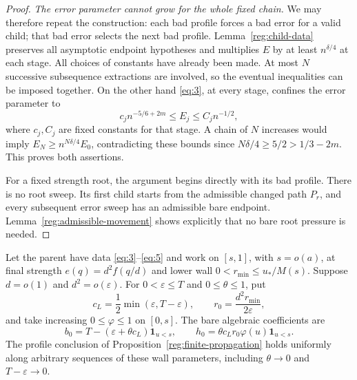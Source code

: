\begin{proof}
\emph{The error parameter cannot grow for the whole fixed chain.}
We may therefore repeat the construction: each bad profile forces
a bad error for a valid child; that bad error selects the next bad
profile.  Lemma~\ref{reg:child-data} preserves all asymptotic
endpoint hypotheses and multiplies $E$ by at least
$n^{\delta/4}$ at each stage.  All choices of constants have
already been made.  At most $N$ successive subsequence extractions
are involved, so the eventual inequalities can be imposed together.
On the other hand \eqref{eq:3}, at every stage, confines the error
parameter to
\[
 c_j n^{-5/6+2m}\le E_j\le C_j n^{-1/2},
\]
where $c_j,C_j$ are fixed constants for that stage.  A chain of
$N$ increases would imply
$E_N\ge n^{N\delta/4}E_0$, contradicting these bounds since
$N\delta/4\ge5/2>1/3-2m$.  This proves both assertions.

For a fixed strength root, the argument begins directly with its
bad profile.  There is no root sweep.  Its first child starts from
the admissible changed path $P_r$, and every subsequent error
sweep has an admissible bare endpoint.  Lemma~\ref{reg:admissible-movement}
shows explicitly that no bare root pressure is needed.
\end{proof}

\begin{corollary}\label{reg:wall-uniformity}
Let the parent have data \eqref{eq:3}--\eqref{eq:5} and work on
$[s,1]$, with $s=o(a)$, at final strength
$e(q)=d^2f(q/d)$ and lower wall
$0<r_{\min}\le u_*/M(s)$.  Suppose $d=o(1)$ and $d^2=o(\varepsilon)$.
For $0<\varepsilon\le T$ and $0\le\theta\le1$, put
\[
 c_L=\frac12\min(\varepsilon,T-\varepsilon),\qquad
 r_0=\frac{d^2r_{\min}}{2\varepsilon},
\]
and take increasing $0\le\varphi\le1$ on $[0,s]$.  The bare
algebraic coefficients are
\[
 b_0=T-(\varepsilon+\theta c_L)\mathbf1_{u<s},\qquad
 h_0=\theta c_Lr_0\varphi(u)\mathbf1_{u<s}.
\]
The profile conclusion of Proposition~\ref{reg:finite-propagation}
holds uniformly along arbitrary sequences of these wall parameters,
including $\theta\to0$ and $T-\varepsilon\to0$.
\end{corollary}


